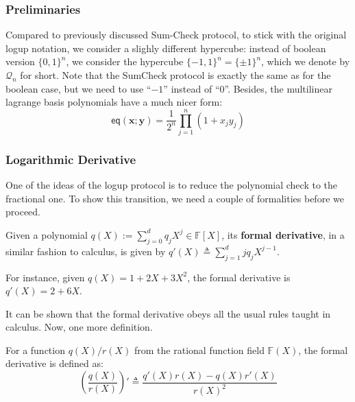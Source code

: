 \documentclass[../../book]{subfiles}
\begin{document}
\subsubsection{Preliminaries}

Compared to previously discussed Sum-Check protocol, to stick with the original
logup notation, we consider a slighly different hypercube: instead of boolean
version $\{0,1\}^n$, we consider the hypercube $\{-1,1\}^n=\{\pm 1\}^n$, which
we denote by $\mathcal{Q}_n$ for short. Note that the SumCheck protocol is
exactly the same as for the boolean case, but we need to use ``$-1$'' instead of
``$0$''. Besides, the multilinear lagrange basis polynomials have a much 
nicer form:
\begin{equation*}
    \mathsf{eq}(\mathbf{x};\mathbf{y}) = \frac{1}{2^n}\prod_{j=1}^n (1+x_jy_j)
\end{equation*}

\subsubsection{Logarithmic Derivative}

One of the ideas of the logup protocol is to reduce the polynomial check 
to the fractional one. To show this transition, we need a couple of formalities 
before we proceed.

\begin{definition}
    Given a polynomial $q(X) := \sum_{j=0}^d q_jX^j \in \mathbb{F}[X]$, its
    \textbf{formal derivative}, in a similar fashion to calculus, is given by
    $q'(X) \triangleq \sum_{j=1}^{d}jq_jX^{j-1}$.
\end{definition}

\begin{example}
    For instance, given $q(X)=1+2X+3X^2$, the formal derivative is $q'(X)=2+6X$.
\end{example}

It can be shown that the formal derivative obeys all the usual rules taught 
in calculus. Now, one more definition.
\begin{definition}
    For a function $q(X)/r(X)$ from the rational function field $\mathbb{F}(X)$, the 
    formal derivative is defined as:
    \begin{equation*}
        \left(\frac{q(X)}{r(X)}\right)' \triangleq \frac{q'(X)r(X)-q(X)r'(X)}{r(X)^2}
    \end{equation*}
\end{definition}
\end{document}
